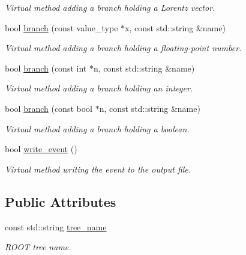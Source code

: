 \begin{DoxyCompactItemize}
\begin{DoxyCompactList}\small\item\em Virtual method adding a branch holding a Lorentz vector. \end{DoxyCompactList}\item 
\hypertarget{a00481_a1eb58837e2275b9ec56fcd98b943a21d}{}bool \hyperlink{a00481_a1eb58837e2275b9ec56fcd98b943a21d}{branch} (const value\+\_\+type $\ast$x, const std\+::string \&name)\label{a00481_a1eb58837e2275b9ec56fcd98b943a21d}

\begin{DoxyCompactList}\small\item\em Virtual method adding a branch holding a floating-\/point number. \end{DoxyCompactList}\item 
\hypertarget{a00481_a8f0f5e963b9ab9dc9d4f9318a6a7cbf6}{}bool \hyperlink{a00481_a8f0f5e963b9ab9dc9d4f9318a6a7cbf6}{branch} (const int $\ast$n, const std\+::string \&name)\label{a00481_a8f0f5e963b9ab9dc9d4f9318a6a7cbf6}

\begin{DoxyCompactList}\small\item\em Virtual method adding a branch holding an integer. \end{DoxyCompactList}\item 
\hypertarget{a00481_a75478ad9b737d76ea983ecc1583d6bce}{}bool \hyperlink{a00481_a75478ad9b737d76ea983ecc1583d6bce}{branch} (const bool $\ast$n, const std\+::string \&name)\label{a00481_a75478ad9b737d76ea983ecc1583d6bce}

\begin{DoxyCompactList}\small\item\em Virtual method adding a branch holding a boolean. \end{DoxyCompactList}\item 
\hypertarget{a00481_a9be150afdc00d9d7b3c9db35f5494968}{}bool \hyperlink{a00481_a9be150afdc00d9d7b3c9db35f5494968}{write\+\_\+event} ()\label{a00481_a9be150afdc00d9d7b3c9db35f5494968}

\begin{DoxyCompactList}\small\item\em Virtual method writing the event to the output file. \end{DoxyCompactList}\end{DoxyCompactItemize}
\subsection*{Public Attributes}
\begin{DoxyCompactItemize}
\item 
\hypertarget{a00481_aec66ac94eb5969f4d22f50c1d1db2ba5}{}const std\+::string \hyperlink{a00481_aec66ac94eb5969f4d22f50c1d1db2ba5}{tree\+\_\+name}\label{a00481_aec66ac94eb5969f4d22f50c1d1db2ba5}

\begin{DoxyCompactList}\small\item\em R\+O\+O\+T tree name. \end{DoxyCompactList}\end{DoxyCompactItemize}


